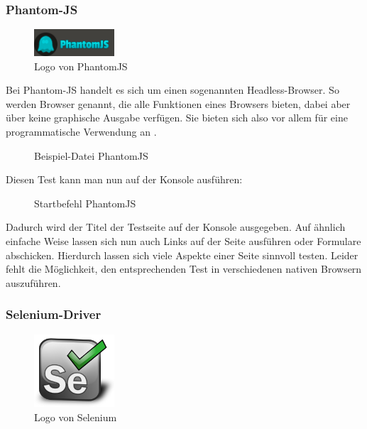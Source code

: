 \subsubsection{Phantom-JS}

\begin{figure}[H]
	\begin{center}
		\includegraphics[width=3cm]{bilder/phantomjs}
		\caption{Logo von PhantomJS}
		\label{image:phantomjs}
	\end{center}
\end{figure}

Bei Phantom-JS handelt es sich um einen sogenannten Headless-Browser. So werden Browser genannt, die alle Funktionen eines Browsers bieten, dabei aber über keine graphische Ausgabe verfügen. Sie bieten sich also vor allem für eine programmatische Verwendung an \citep[Vgl.][]{Hidayat13}.

\begin{figure}[H]
	\begin{center}
		\caption{Beispiel-Datei PhantomJS}
		\label{code:phantomjs}
	\end{center}
\end{figure}

Diesen Test kann man nun auf der Konsole ausführen:

\begin{figure}[H]
	\begin{center}
		\caption{Startbefehl PhantomJS}
		\label{bash:phantomjs}
	\end{center}
\end{figure}

Dadurch wird der Titel der Testseite auf der Konsole ausgegeben. Auf ähnlich einfache Weise lassen sich nun auch Links auf der Seite ausführen oder Formulare abschicken. Hierdurch lassen sich viele Aspekte einer Seite sinnvoll testen. Leider fehlt die Möglichkeit, den entsprechenden Test in verschiedenen nativen Browsern auszuführen.

\subsubsection{Selenium-Driver}

\begin{figure}[H]
	\begin{center}
		\includegraphics[width=3cm]{bilder/selenium}
		\caption{Logo von Selenium}
		\label{image:selenium}
	\end{center}
\end{figure}

